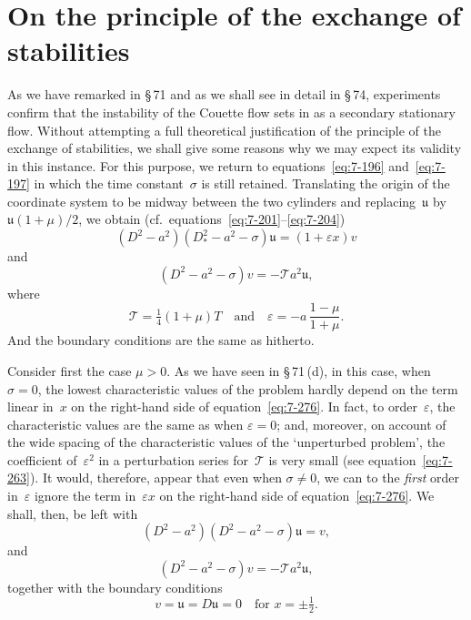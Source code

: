 
\section{On the principle of the exchange of stabilities}\label{sec:7-72}

As we have remarked in \S\,71 and as we shall see in detail in \S\,74,
experiments confirm that the instability of the Couette flow sets in as a
secondary stationary flow.  Without attempting a full theoretical
justification of the principle of the exchange of stabilities, we shall give
some reasons why we may expect its validity in this instance.  For this
purpose, we return to equations~\eqref{eq:7-196} and~\eqref{eq:7-197} in which the time
constant~$\sigma$ is still retained.  Translating the origin of the coordinate
system to be midway between the two cylinders and replacing~$\mathfrak{u}$ by
$\mathfrak{u}(1+\mu)/2$, we obtain (cf.\ equations~\eqref{eq:7-201}--\eqref{eq:7-204})
\begin{equation}
\label{eq:7-276}
(D^2-a^2)(D^2_*-a^2-\sigma)\mathfrak{u} = (1+\varepsilon x)v
\end{equation}
and
\begin{equation}
\label{eq:7-277}
(D^2-a^2-\sigma)v = -\mathscr{T}a^2\mathfrak{u},
\end{equation}
where
\begin{equation}
\label{eq:7-278}
\mathscr{T} = \tfrac{1}{4}(1+\mu)T \quad \text{and} \quad
\varepsilon = -a\,\frac{1-\mu}{1+\mu}.
\end{equation}
And the boundary conditions are the same as hitherto.

Consider first the case $\mu > 0$.  As we have seen in \S\,71\,(d), in this case,
when $\sigma = 0$, the lowest characteristic values of the problem hardly
depend on the term linear in~$x$ on the right-hand side of equation~\eqref{eq:7-276}.
In fact, to order~$\varepsilon$, the characteristic values are the same as when $\varepsilon = 0$;
and, moreover, on account of the wide spacing of the characteristic
values of the `unperturbed problem', the coefficient of~$\varepsilon^2$ in a perturbation
series for~$\mathscr{T}$ is very small (see equation~\eqref{eq:7-263}).  It would, therefore,
appear that even when $\sigma \ne 0$, we can to the \emph{first} order in~$\varepsilon$ ignore the term
in~$\varepsilon x$ on the right-hand side of equation~\eqref{eq:7-276}.  We shall, then, be left with
\begin{equation}
\label{eq:7-279}
(D^2-a^2)(D^2-a^2-\sigma)\mathfrak{u} = v,
\end{equation}
and
\begin{equation}
\label{eq:7-280}
(D^2-a^2-\sigma)v = -\mathscr{T}a^2\mathfrak{u},
\end{equation}
together with the boundary conditions
\begin{equation}
\label{eq:7-281}
v = \mathfrak{u} = D\mathfrak{u} = 0 \quad \text{for } x = \pm\tfrac{1}{2}.
\end{equation}

